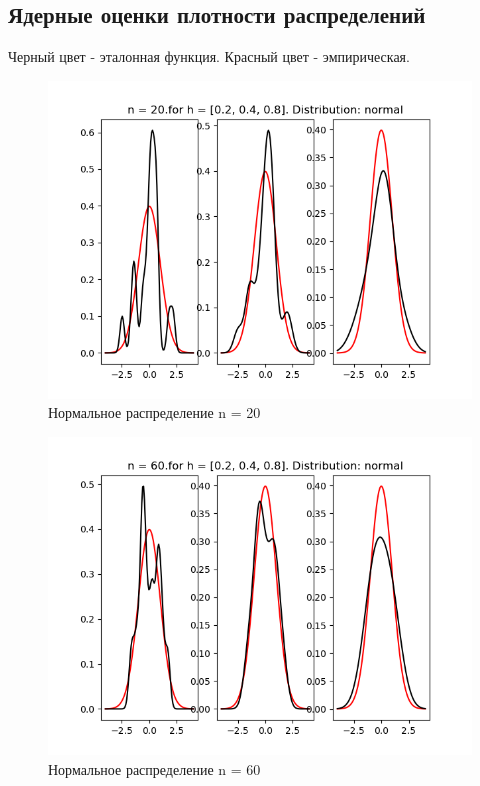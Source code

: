 \documentclass[a4]{article}
\begin{document}
		\subsection{Ядерные оценки плотности распределений}
		Черный цвет - эталонная функция. Красный цвет - эмпирическая.
		\begin{center}
		\begin{figure}[h!]
			\includegraphics[width=\textwidth]{normalker20.png} 
			\caption[Нормальное распределение n = 20]{Нормальное распределение n = 20}
		\end{figure}
		\newpage
		\begin{figure}[h!]
			\includegraphics[width=\textwidth]{normalker60.png} 
			\caption[Нормальное распределение n = 60]{Нормальное распределение n = 60}

\end{figure}
\end{center}
\end{document}
